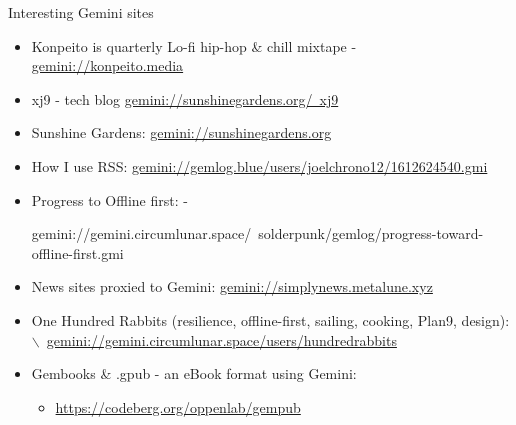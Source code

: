 \documentclass[presentation, 11pt,  aspectratio=169]{beamer}
\begin{document}
\begin{frame}[label={sec:orgf264ee5}]{Interesting Gemini sites}
\begin{itemize}
\item \alert{Konpeito is quarterly Lo-fi hip-hop \& chill mixtape} - \href{gemini://konpeito.media}{gemini://konpeito.media}\\
\item \alert{xj9 - tech blog} \href{gemini://sunshinegardens.org/~xj9}{gemini://sunshinegardens.org/~xj9}\\
\item \alert{Sunshine Gardens:} \href{gemini://sunshinegardens.org}{gemini://sunshinegardens.org}\\
\item \alert{How I use RSS:} \href{gemini://gemlog.blue/users/joelchrono12/1612624540.gmi}{gemini://gemlog.blue/users/joelchrono12/1612624540.gmi} \\
\item \alert{Progress to Offline first:} -\\
\begin{small} gemini://gemini.circumlunar.space/~solderpunk/gemlog/progress-toward-offline-first.gmi
\end{small}
\item \alert{News sites proxied to Gemini:} \href{gemini://simplynews.metalune.xyz}{gemini://simplynews.metalune.xyz}\\
\item \alert{One Hundred Rabbits (resilience, offline-first, sailing, cooking, Plan9, design):}$\backslash$\ \href{gemini://gemini.circumlunar.space/users/hundredrabbits}{gemini://gemini.circumlunar.space/users/hundredrabbits}\\
\item \alert{Gembooks \& .gpub - an eBook format using Gemini:}\\
\begin{itemize}
\item \url{https://codeberg.org/oppenlab/gempub}\\
\end{itemize}
\end{itemize}
\end{frame}
\end{document}
